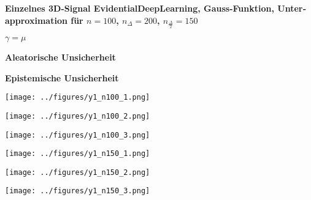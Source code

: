 \begin{otherlanguage}{ngerman}
\begin{samepage}
\begin{minipage}{\textwidth}

\noindent\textbf{Einzelnes 3D-Signal \gls{EvidentialDeepLearning}, Gauss-Funktion,
Unterapproximation für $n=100$, $n_{\Delta}=200$, $n_{\frac{\Delta}{2}}=150$}


\begin{minipage}{0.05\textwidth}\vspace{0.5cm}\end{minipage}%
\begin{minipage}{0.3\textwidth}\centering \textbf{$\gamma=\mu$}\end{minipage}%
\begin{minipage}{0.3\textwidth}\centering \textbf{Aleatorische Unsicherheit}\end{minipage}%
\begin{minipage}{0.3\textwidth}\centering \textbf{Epistemische Unsicherheit}\end{minipage}

\vspace{0.125cm}

\begin{minipage}{0.05\textwidth}\centering{}\end{minipage}%
\begin{minipage}{0.3\textwidth}\centering\texttt{[image: ../figures/y1\_n100\_1.png]}\end{minipage}%
\begin{minipage}{0.3\textwidth}\centering\texttt{[image: ../figures/y1\_n100\_2.png]}\end{minipage}%
\begin{minipage}{0.3\textwidth}\centering\texttt{[image: ../figures/y1\_n100\_3.png]}\end{minipage}

\vspace{0.125cm}

\begin{minipage}{0.05\textwidth}\centering{}\end{minipage}%
\begin{minipage}{0.3\textwidth}\centering\texttt{[image: ../figures/y1\_n150\_1.png]}\end{minipage}%
\begin{minipage}{0.3\textwidth}\centering\texttt{[image: ../figures/y1\_n150\_2.png]}\end{minipage}%
\begin{minipage}{0.3\textwidth}\centering\texttt{[image: ../figures/y1\_n150\_3.png]}\end{minipage}


\end{minipage}
\end{samepage}
\end{otherlanguage}
